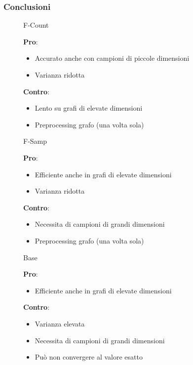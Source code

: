 \begin{frame}
	\frametitle{Conclusioni}
	\centering

	\pause
	
	\begin{figure}[h]
		\begin{minipage}[t]{.32\textwidth}
			\centering
			\Large
			F-Count
			\medskip

			\small		
			\textbf{Pro}:
			\begin{itemize}
				\item Accurato anche con campioni di piccole dimensioni
				\item Varianza ridotta
			\end{itemize}
		
			\textbf{Contro}:
			\begin{itemize}
				\item Lento su grafi di elevate dimensioni
				\item Preprocessing grafo (una volta sola)
			\end{itemize}
		\end{minipage}\hfill
		\pause
		\begin{minipage}[t]{.32\textwidth}
			\centering
			\Large
			F-Samp
			\medskip
			
			\small		
			\textbf{Pro}:
			\begin{itemize}
				\item Efficiente anche in grafi di elevate dimensioni
				\item Varianza ridotta
			\end{itemize}
			
			\textbf{Contro}:
			\begin{itemize}
				\item Necessita di campioni di grandi dimensioni
				\item Preprocessing grafo (una volta sola)
			\end{itemize}
		\end{minipage}\hfill
		\pause
		\begin{minipage}[t]{.32\textwidth}
			\centering
			\Large
			Base
			\medskip
			
			\small		
			\textbf{Pro}:
			\begin{itemize}
				\item Efficiente anche in grafi di elevate dimensioni
			\end{itemize}
			
			\textbf{Contro}:
			\begin{itemize}
				\item Varianza elevata
				\item Necessita di campioni di grandi dimensioni
				\item Può non convergere al valore esatto
			\end{itemize}
		\end{minipage}\hfill
		
	\end{figure}
\end{frame}
